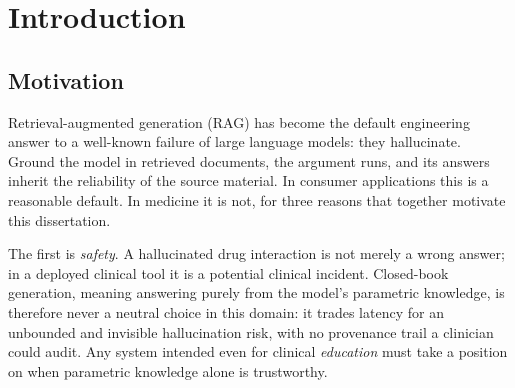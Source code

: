 \chapter{Introduction}
\label{ch:intro}

\section{Motivation}
\label{sec:intro-motivation}

Retrieval-augmented generation (RAG) has become the default engineering answer
to a well-known failure of large language models: they hallucinate. Ground the
model in retrieved documents, the argument runs, and its answers inherit the
reliability of the source material. In consumer applications this is a
reasonable default. In medicine it is not, for three reasons that together
motivate this dissertation.

The first is \emph{safety}. A hallucinated drug interaction is not merely a
wrong answer; in a deployed clinical tool it is a potential clinical incident.
Closed-book generation, meaning answering purely from the model's parametric
knowledge, is therefore never a neutral choice in this domain: it trades
latency for an unbounded and invisible hallucination risk, with no provenance
trail a clinician could audit. Any system intended even for clinical
\emph{education} must take a position on when parametric knowledge alone is
trustworthy.

